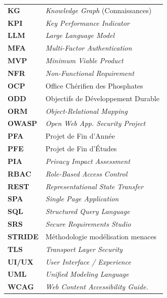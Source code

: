 \begin{minipage}[t]{0.48\textwidth}
\begin{tabularx}{\textwidth}{l X}
\textbf{KG} & \textit{Knowledge Graph} (Connaissances) \\
\textbf{KPI} & \textit{Key Performance Indicator} \\
\textbf{LLM} & \textit{Large Language Model} \\
\textbf{MFA} & \textit{Multi-Factor Authentication} \\
\textbf{MVP} & \textit{Minimum Viable Product} \\
\textbf{NFR} & \textit{Non-Functional Requirement} \\
\textbf{OCP} & Office Chérifien des Phosphates \\
\textbf{ODD} & Objectifs de Développement Durable \\
\textbf{ORM} & \textit{Object-Relational Mapping} \\
\textbf{OWASP} & \textit{Open Web App. Security Project} \\
\textbf{PFA} & Projet de Fin d'Année \\
\textbf{PFE} & Projet de Fin d'Études \\
\textbf{PIA} & \textit{Privacy Impact Assessment} \\
\textbf{RBAC} & \textit{Role-Based Access Control} \\
\textbf{REST} & \textit{Representational State Transfer} \\
\textbf{SPA} & \textit{Single Page Application} \\
\textbf{SQL} & \textit{Structured Query Language} \\
\textbf{SRS} & \textit{Secure Requirements Studio} \\
\textbf{STRIDE} & Méthodologie modélisation menaces \\
\textbf{TLS} & \textit{Transport Layer Security} \\
\textbf{UI/UX} & \textit{User Interface / Experience} \\
\textbf{UML} & \textit{Unified Modeling Language} \\
\textbf{WCAG} & \textit{Web Content Accessibility Guide.} \\
\end{tabularx}
\end{minipage}

\vfill
\newpage
